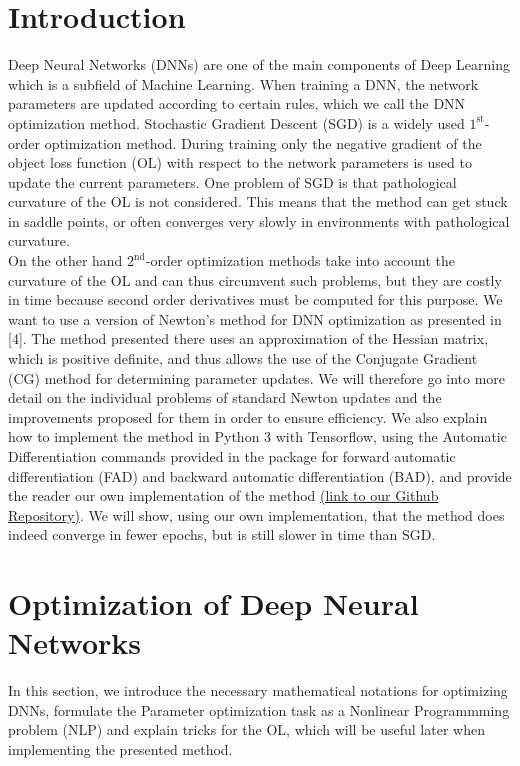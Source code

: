 \documentclass[conference]{IEEEtran}
\begin{document}
	\section{Introduction} 
	{\color{red}Deep Neural Networks (DNNs) are one of the main components of Deep Learning which is a subfield of Machine Learning.} When training a DNN, the network parameters are updated according to certain rules, which we call the DNN optimization method. Stochastic Gradient Descent (SGD) is a widely used $1^{\text{st}}$-order optimization method. During training only the negative gradient of the object loss function (OL) with respect to the network parameters is used to update the current parameters.
	One problem of SGD is that pathological curvature of the OL is not considered. This means that the method can get stuck in saddle points, or often converges very slowly in environments with pathological curvature. \\
	On the other hand $2^{\text{nd}}$-order optimization methods take into account the curvature of the OL and can thus circumvent such problems, but they are costly in time because second order derivatives must be computed for this purpose. 
	We want to use a version of Newton's method for DNN optimization as presented in [4].
	{\color{red}The method presented there} uses an approximation of the Hessian matrix, which is positive definite, and thus allows the use of the Conjugate Gradient (CG) method for determining parameter updates. We will 	{\color{red}therefore go into more detail} on the individual problems of standard Newton updates and the improvements proposed for them in order to ensure efficiency.
	We also explain how to implement the method in Python 3 with Tensorflow, using the Automatic Differentiation commands provided in the package for forward automatic differentiation (FAD) and backward automatic differentiation (BAD), and provide the reader our own implementation of the method \href{https://github.com/NiklasBrunn/Hessian_Free_Optimization_of_Deep_Neural_Networks}{(link to our Github Repository)}. We will show, using our own implementation, that the method does indeed converge in fewer epochs, but is still slower in time than SGD.
	
	
	\section{Optimization of Deep Neural Networks}
	In this section, we introduce the necessary mathematical notations for optimizing DNNs, formulate the Parameter optimization task as a Nonlinear Programmming problem (NLP) and explain tricks for the OL, which will be useful later when implementing the presented method.\\
	
\end{document}

